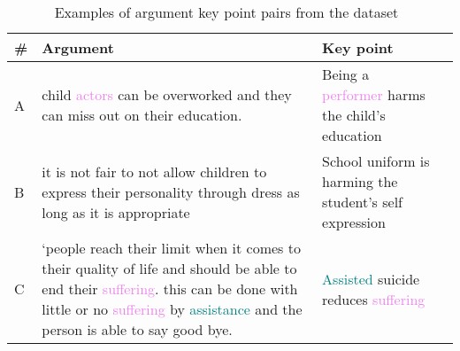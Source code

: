 \begin{table*}
    \caption{Examples of  argument key point pairs from the \ArgKP dataset~\cite{Bar-HaimEFKLS2020}}
    \label{examples}
    \begin{tabularx}{\linewidth}{lXp{4.3cm}c}
      \toprule
      \textbf{\#} & \textbf{Argument} & \textbf{Key point} \\
      \midrule
      A & %
      child \textcolor{violet}{actors} can be overworked and they can miss out on their education. & %
      Being a \textcolor{violet}{performer} harms the child's education \\ %
      B & %
      it is not fair to not allow children to express their personality through dress as long as it is appropriate & %
      School uniform is harming the student's self expression \\ %
      C & %
      `people reach their limit when it comes to their quality of life and should be able to end their \textcolor{violet}{suffering}. this can be done with little or no \textcolor{violet}{suffering} by \textcolor{teal}{assistance} and the person is able to say good bye. & %
      \textcolor{teal}{Assisted} suicide reduces \textcolor{violet}{suffering} \\ %
      \bottomrule
    \end{tabularx}
  \end{table*}
